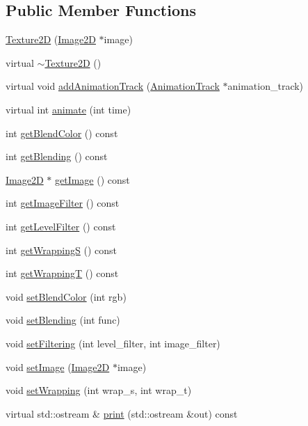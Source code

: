 \subsection*{Public Member Functions}
\begin{CompactItemize}
\item 
\hyperlink{classm3g_1_1Texture2D_7a8d6431e41022e29ac936afc5e97b8e}{Texture2D} (\hyperlink{classm3g_1_1Image2D}{Image2D} $\ast$image)
\item 
virtual \hyperlink{classm3g_1_1Texture2D_060332aea614a81a914cd2e55f1794df}{$\sim$Texture2D} ()
\item 
virtual void \hyperlink{classm3g_1_1Texture2D_415c0b110f95410ded9b85e5d99a496b}{addAnimationTrack} (\hyperlink{classm3g_1_1AnimationTrack}{AnimationTrack} $\ast$animation\_\-track)
\item 
virtual int \hyperlink{classm3g_1_1Texture2D_82cfeb67ca66b93e2ca7bda9a4f0e2aa}{animate} (int time)
\item 
int \hyperlink{classm3g_1_1Texture2D_b7dc7b7bf2934448281894f2c1ef3638}{getBlendColor} () const 
\item 
int \hyperlink{classm3g_1_1Texture2D_078954de3d786bd11dc98b06f237bbbb}{getBlending} () const 
\item 
\hyperlink{classm3g_1_1Image2D}{Image2D} $\ast$ \hyperlink{classm3g_1_1Texture2D_a8c0193b0e7d47d4b5c9f60df24c44f5}{getImage} () const 
\item 
int \hyperlink{classm3g_1_1Texture2D_7b1e1ea0acc3d2096d346afdecc2ea5f}{getImageFilter} () const 
\item 
int \hyperlink{classm3g_1_1Texture2D_039f7813e846bedec1aaf4c413c15924}{getLevelFilter} () const 
\item 
int \hyperlink{classm3g_1_1Texture2D_6bdb583791178dc5002f4d0ae88293a9}{getWrappingS} () const 
\item 
int \hyperlink{classm3g_1_1Texture2D_58375e5e8ddde63dcf74f882d053ae3f}{getWrappingT} () const 
\item 
void \hyperlink{classm3g_1_1Texture2D_b5a6333203f443fb1f66ea2e39d4de1b}{setBlendColor} (int rgb)
\item 
void \hyperlink{classm3g_1_1Texture2D_189d98ce3e8ac7590be771944b3186d4}{setBlending} (int func)
\item 
void \hyperlink{classm3g_1_1Texture2D_857574b5c0f3e0ca9239bafb4008cae1}{setFiltering} (int level\_\-filter, int image\_\-filter)
\item 
void \hyperlink{classm3g_1_1Texture2D_705b89b41cd1b38f664ed912be44baaa}{setImage} (\hyperlink{classm3g_1_1Image2D}{Image2D} $\ast$image)
\item 
void \hyperlink{classm3g_1_1Texture2D_e676f34bd2f5ee1508ad1cb771702d8f}{setWrapping} (int wrap\_\-s, int wrap\_\-t)
\item 
virtual std::ostream \& \hyperlink{classm3g_1_1Texture2D_6fea17fa1532df3794f8cb39cb4f911f}{print} (std::ostream \&out) const 
\end{CompactItemize}

